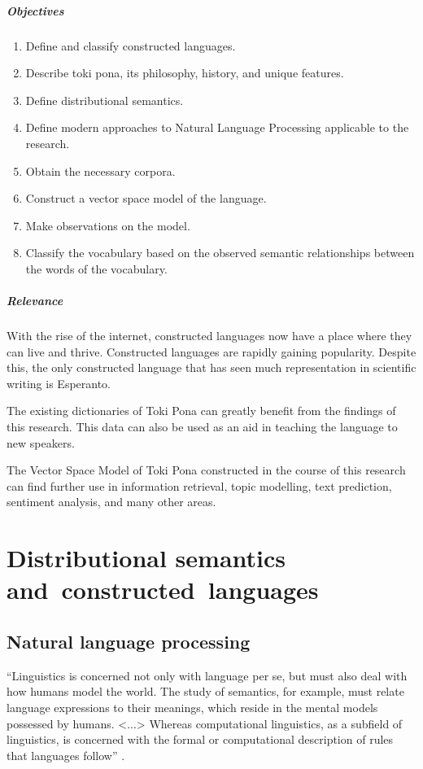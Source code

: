 \documentclass[14pt, a4paper]{extreport}
\begin{document}
\paragraph{Objectives}

\begin{enumerate}
  \item Define and classify constructed languages.
  \item Describe toki pona, its philosophy, history, and unique features.
  \item Define distributional semantics.
  \item Define modern approaches to Natural Language Processing applicable to the research.
  \item Obtain the necessary corpora.
  \item Construct a vector space model of the language.
  \item Make observations on the model.
  \item Classify the vocabulary based on the observed semantic relationships between the words of the vocabulary.
\end{enumerate}


\paragraph{Relevance}

With the rise of the internet, constructed languages now have a place where they can live and thrive. Constructed languages are rapidly gaining popularity. Despite this, the only constructed language that has seen much representation in scientific writing is Esperanto.

The existing dictionaries of Toki Pona can greatly benefit from the findings of this research. This data can also be used as an aid in teaching the language to new speakers.

The Vector Space Model of Toki Pona constructed in the course of this research can find further use in information retrieval, topic modelling, text prediction, sentiment analysis, and many other areas.



\chapter{Distributional semantics and~constructed~languages}

\section{Natural language processing}
``Linguistics is concerned not only with language per se, but must also deal with how humans model the world. The study of semantics, for example, must relate language expressions to their meanings, which reside in the mental models possessed by humans. <...> Whereas computational linguistics, as a subfield of linguistics, is concerned with the formal or computational description of rules that languages follow'' \parencite{nlpandcl}.
\end{document}
